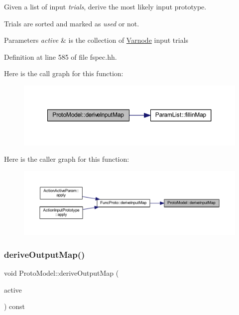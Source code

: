 Given a list of input {\itshape trials}, derive the most likely input prototype. 

Trials are sorted and marked as {\itshape used} or not. 
\begin{DoxyParams}{Parameters}
{\em active} & is the collection of \mbox{\hyperlink{class_varnode}{Varnode}} input trials \\
\hline
\end{DoxyParams}


Definition at line 585 of file fspec.\+hh.

Here is the call graph for this function\+:
\nopagebreak
\begin{figure}[H]
\begin{center}
\leavevmode
\includegraphics[width=350pt]{class_proto_model_a7f6da17343cb12b0e798fe7211441c58_cgraph}
\end{center}
\end{figure}
Here is the caller graph for this function\+:
\nopagebreak
\begin{figure}[H]
\begin{center}
\leavevmode
\includegraphics[width=350pt]{class_proto_model_a7f6da17343cb12b0e798fe7211441c58_icgraph}
\end{center}
\end{figure}
\mbox{\label{class_proto_model_a463595607985ec774f3df35dfbd7ca94}} 
\subsubsection{\texorpdfstring{deriveOutputMap()}{deriveOutputMap()}}
{\footnotesize\ttfamily void Proto\+Model\+::derive\+Output\+Map (\begin{DoxyParamCaption}\item[{\mbox{\hyperlink{class_param_active}{Param\+Active}} $\ast$}]{active }\end{DoxyParamCaption}) const\hspace{0.3cm}{\ttfamily [inline]}}



